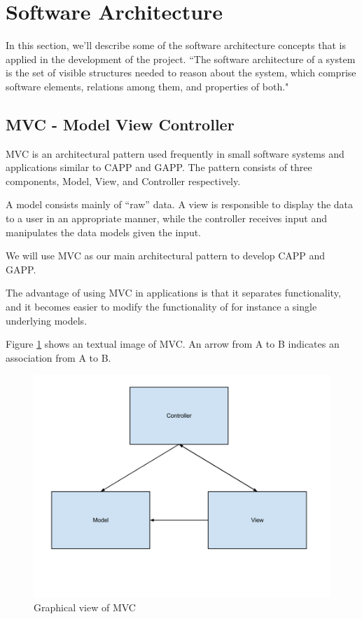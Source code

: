 
\section{Software Architecture}
In this section, we'll describe some of the software architecture concepts that is applied in the development of the project.
``The software architecture of a system is the set of visible structures needed to reason about the system, which comprise software elements, relations among them, and properties of both." \cite{bassclemetskazman}
 
 
\subsection{MVC - Model View Controller}
\label{sec:mvcintro}
MVC is an architectural pattern used frequently in small software systems and applications similar to CAPP and GAPP.
The pattern consists of three components, Model, View, and Controller respectively.

A model consists mainly of ``raw'' data. A view is responsible to display the data to a user in an appropriate manner, while the controller receives input and manipulates the data models 
given the input. 

We will use MVC as our main architectural pattern to develop CAPP and GAPP. 
  
The advantage of using MVC in applications is that it separates functionality, and it becomes easier to modify the functionality of for instance a single underlying models. 


Figure \ref{fig:diagram-mvc} shows an textual image of MVC. An arrow from A to B indicates an association from A to B.
\begin{figure}
	\centering
		\includegraphics[width = 17.5 cm]{Pictures/ArchPictures/MVC.png}
	\caption{Graphical view of MVC}
	\label{fig:diagram-mvc}
\end{figure}

